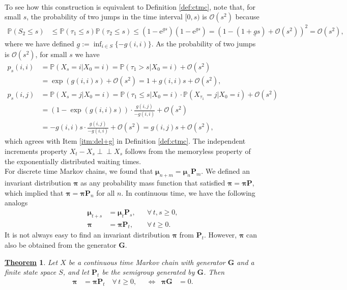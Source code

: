 \documentclass[12pt]{book}
\numberwithin{equation}{chapter}
\theoremstyle{plain}
\newtheorem{theorem}{\underline{Theorem}}
\numberwithin{theorem}{section}
\theoremstyle{definition}
\numberwithin{exercise}{chapter}
\newcommand{\<}{\langle}
\renewcommand{\>}{\rangle}
\renewcommand{\(}{\left(}
\renewcommand{\)}{\right)}
\renewcommand{\[}{\left[}
\renewcommand{\]}{\right]}
\newcommand\Pb{\mathds{P}}
\newcommand\Oc{\mathscr{O}}
\newcommand\Gv{\pmb{G}}
\newcommand\Pv{\pmb{P}}
\newcommand\muv{\pmb{\mu}}
\newcommand\piv{\pmb{\pi}}
\newcommand{\ind}{\perp \! \! \! \perp}
\newcommand\ee{\mathrm{e}}
\begin{document}
\\[0.5em]  
To see how this construction is equivalent to Definition \ref{def:ctmc}, note that, for small $s$, the probability of two jumps in the time interval $[0,s)$ is $\Oc(s^2)$ because
\begin{align}
\Pb( S_2 \leq s )
	&\leq \Pb(\tau_1 \leq s) \Pb( \tau_2 \leq s )
	\leq (1 - \ee^{\underline{g} s}) (1 - \ee^{\underline{g} s} )
	=	(1 - (1 + \underline{g} s) + \Oc(s^2) )^2
	=	\Oc(s^2) ,
\end{align} 
where we have defined $\underline{g} := \inf_{ i \in S} \{ -g(i,i) \}$.
As the probability of two jumps is $\Oc(s^2)$, for small $s$ we have
\begin{align}
p_s(i,i)
	&=	\Pb( X_{s} = i |  X_0 = i)
	=		\Pb( \tau_1 > s | X_0 = i ) + \Oc(s^2) \\
	&=	\exp( g(i,i) s) + \Oc(s^2)
	=		1 + g(i,i) s + \Oc(s^2) , \\
p_s(i,j)
	&=	\Pb( X_{s} = j |  X_0 = i)
	=		\Pb( \tau_1 \leq s | X_0 = i ) \cdot \Pb( X_{\tau_1} = j |  X_0 = i)  + \Oc(s^2) \\
	&=	( 1 - \exp( g(i,i) s) ) \cdot \frac{g(i,j)}{-g(i,i)} + \Oc(s^2) \\
	&=		- g(i,i) s \cdot \frac{g(i,j)}{-g(i,i)} + \Oc(s^2)
	=		g(i,j) s + \Oc(s^2) ,
\end{align}
which agrees with Item \ref{itm:del+g} in Definition \ref{def:ctmc}.  The independent increments property $X_t - X_s \ind X_s$ follows from the memoryless property of the exponentially distributed waiting times.
\\[0.5em]
For discrete time Markov chains, we found that $\muv_{n+m} = \muv_n \Pv_m$.  We defined an invariant distribution $\piv$ as any probability mass function that satisfied $\piv = \piv \Pv$, which implied that $\piv = \piv \Pv_n$ for all $n$.  In continuous time, we have the following analogs
\begin{align}
\muv_{t+s}
	&=	\muv_t \Pv_s , &
	& 	\forall \, t,s \geq 0 , \\
\piv
	&=	\piv \Pv_t , & 
	&		\forall \, t \geq 0 .
\end{align}
It is not always easy to find an invariant distribution $\piv$ from $\Pv_t$.  However, $\piv$ can also be obtained from the generator $\Gv$.

\begin{theorem}
Let $X$ be a continuous time Markov chain with generator $\Gv$ and a finite state space $S$, and let $\Pv_t$ be the semigroup generated by $\Gv$.  Then
\begin{align}
\piv
	&=	\piv \Pv_t \quad \forall \, t \geq 0 , &
	&\Leftrightarrow &
\piv \Gv
	&=	0 .
\end{align}
\label{ctmc-stat}
\end{theorem}
\end{document}
